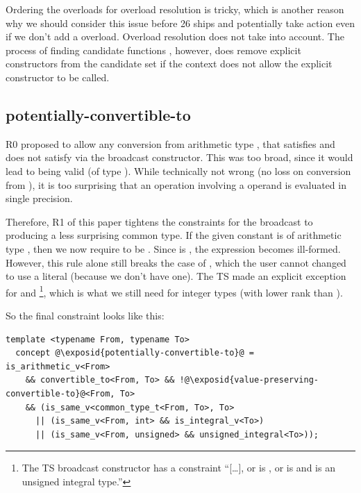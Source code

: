 Ordering the overloads for overload resolution is tricky, which is another reason why we should
consider this issue before \CC{}26 ships and potentially take action even if we don't add a
 overload.
Overload resolution does not take  into account.
The process of finding candidate functions%
\href{https://eel.is/c++draft/over.match#funcs.general-8}{}, however,
does remove explicit constructors from the candidate set if the
context does not allow the explicit constructor to be called.

\subsection{potentially-convertible-to}
R0 proposed to allow any conversion from arithmetic type , that satisfies
 and does not satisfy
 via the  broadcast
constructor.
This was too broad, since it would lead to  being valid
(of type ).
While technically not wrong (no loss on conversion from ), it is too surprising that an
operation involving a  operand is evaluated in single precision.

Therefore, R1 of this paper tightens the constraints for the  broadcast to producing
a less surprising common type.
If the given constant is of arithmetic type , then we now require  to be .
Since  is , the expression
 becomes ill-formed.
However, this rule alone still breaks the case of , which the user cannot
changed to use a  literal (because we don't have one).
The TS made an explicit exception for  and \footnote{%
  The TS broadcast constructor has a constraint “[\ldots], or  is , or
   is  and  is an unsigned integral type.”
}, which is what we still
need for integer types (with lower rank than ).

So the final  constraint looks like this:
\medskip\begin{lstlisting}[style=Vc]
template <typename From, typename To>
  concept @\exposid{potentially-convertible-to}@ = is_arithmetic_v<From>
    && convertible_to<From, To> && !@\exposid{value-preserving-convertible-to}@<From, To>
    && (is_same_v<common_type_t<From, To>, To>
      || (is_same_v<From, int> && is_integral_v<To>)
      || (is_same_v<From, unsigned> && unsigned_integral<To>));
\end{lstlisting}

